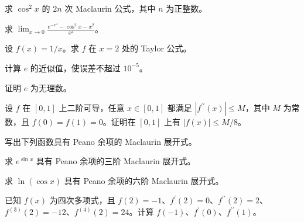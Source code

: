 \noindent\begin{minipage}{\textwidth}
求 $\cos^2x$ 的 $2n$ 次 Maclaurin 公式，其中 $n$ 为正整数。
\end{minipage}\par\vfill
\newpage
\noindent\begin{minipage}{\textwidth}
求 $\displaystyle\lim_{x\to0}\frac{e^{-x^4}-\cos^2x-x^2}{x^4}$。
\end{minipage}\par\vfill
\noindent\begin{minipage}{\textwidth}
设 $f(x)=1/x$。求 $f$ 在 $x=2$ 处的 Taylor 公式。
\end{minipage}\par\vfill
\noindent\begin{minipage}{\textwidth}
计算 $e$ 的近似值，使误差不超过 $10^{-5}$。
\end{minipage}\par\vfill
\noindent\begin{minipage}{\textwidth}
证明 $e$ 为无理数。
\end{minipage}\par\vfill
\newpage
\noindent\begin{minipage}{\textwidth}
设 $f$ 在 $[0,1]$ 上二阶可导，任意 $x\in[0,1]$ 都满足 $|f^{\prime\prime}(x)|\le M$，其中 $M$ 为常数，且 $f(0)=f(1)=0$。证明在 $[0,1]$ 上有 $|f(x)|\le M/8$。
\end{minipage}\par\vfill
\noindent\begin{minipage}{\textwidth}
写出下列函数具有 Peano 余项的 Maclaurin 展开式。
\end{minipage}\par\vfill
\noindent\begin{minipage}{\textwidth}
求 $e^{\sin x}$ 具有 Peano 余项的三阶 Maclaurin 展开式。
\end{minipage}\par\vfill
\noindent\begin{minipage}{\textwidth}
求 $\ln(\cos x)$ 具有 Peano 余项的六阶 Maclaurin 展开式。
\end{minipage}\par\vfill
\newpage
\noindent\begin{minipage}{\textwidth}
已知 $f(x)$ 为四次多项式，且 $f(2)=-1$、$f^{\prime}(2)=0$、$f^{\prime\prime}(2)=2$、$f^{(3)}(2)=-12$、$f^{(4)}(2)=24$。计算 $f(-1)$、$f^{\prime}(0)$、$f^{\prime\prime}(1)$。
\end{minipage}\par\vfill
